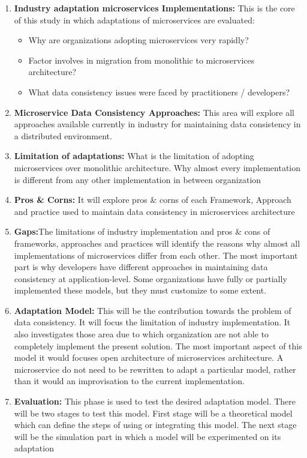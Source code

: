 \documentclass[a4paper,12pt]{article}
\begin{document}
\begin{enumerate}[label=\Alph*.]
\item \textbf{Industry adaptation microservices Implementations:} This is the core of this study in which adaptations of microservices are evaluated:
\begin{itemize}
    \item Why are organizations adopting microservices very rapidly? 
    \item Factor involves in migration from monolithic to microservices architecture? 
    \item What data consistency issues were faced by practitioners / developers? 
\end{itemize}

\item \textbf{Microservice Data Consistency Approaches:} This area will explore all approaches available currently in industry for maintaining data consistency in a distributed environment.
\item \textbf{Limitation of adaptations:} What is the limitation of adopting microservices over monolithic architecture. Why almost every implementation is different from any other implementation in between organization
\item \textbf{Pros \& Corns:} It will explore pros \& corns of each Framework, Approach and practice used to maintain data consistency in microservices architecture
\item \textbf{Gaps:}The limitations of industry implementation and pros \& cons of frameworks, approaches and practices will identify the reasons why almost all implementations of microservices differ from each other. The most important part is why developers have different approaches in maintaining data consistency at application-level. Some organizations have fully or partially implemented these models, but they must customize to some extent.
\item \textbf{Adaptation Model:} This will be the contribution towards the problem of data consistency. It will focus the limitation of industry implementation. It also investigates those area due to which organization are not able to completely implement the present solution. The most important aspect of this model it would focuses open architecture of microservices architecture. A microservice do not need to be rewritten to adapt a particular model, rather than it would an improvisation to the current implementation.
\item \textbf{Evaluation:} This phase is used to test the desired adaptation model. There will be two stages to test this model. First stage will be a theoretical model which can define the steps of using or integrating this model. The next stage will be the simulation part in which a model will be experimented on its adaptation 
\end{enumerate}
 
\end{document}
